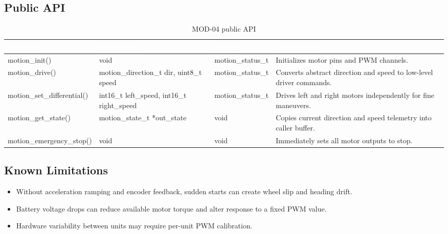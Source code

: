 \documentclass[12pt,a4paper]{article}
\newcommand{\theadtext}[1]{\textcolor{white}{\textbf{#1}}}
\newcommand{\fn}[1]{{\footnotesize\ttfamily #1}}
\begin{document}
\subsection{Public API}

\begin{table}[H]
\centering\small
\begin{tabularx}{\textwidth}{L{5cm} L{4cm} L{2.5cm} X}
\toprule
{}
\theadtext{Function} & \theadtext{Parameters} & \theadtext{Return} & \theadtext{Description} \\
\midrule
{}   \fn{motion\_init()}             & \fn{void} & \fn{motion\_status\_t} & Initializes motor pins and PWM channels. \\
 \fn{motion\_drive()}            & \fn{motion\_direction\_t dir, uint8\_t speed} & \fn{motion\_status\_t} & Converts abstract direction and speed to low-level driver commands. \\
   \fn{motion\_set\_differential()} & \fn{int16\_t left\_speed, int16\_t right\_speed} & \fn{motion\_status\_t} & Drives left and right motors independently for fine maneuvers. \\
 \fn{motion\_get\_state()}       & \fn{motion\_state\_t *out\_state} & \fn{void} & Copies current direction and speed telemetry into caller buffer. \\
   \fn{motion\_emergency\_stop()}  & \fn{void} & \fn{void} & Immediately sets all motor outputs to stop. \\
\bottomrule
\end{tabularx}
\caption{MOD-04 public API}
\end{table}


\subsection{Known Limitations}

\begin{itemize}[leftmargin=1.5em]
  \item Without acceleration ramping and encoder feedback, sudden starts can create wheel slip and heading drift.
  \item Battery voltage drops can reduce available motor torque and alter response to a fixed PWM value.
  \item Hardware variability between units may require per-unit PWM calibration.
\end{itemize}

\newpage
\end{document}
